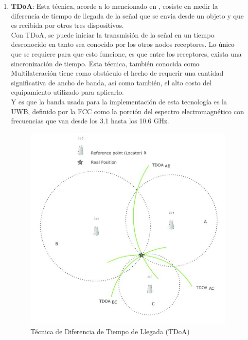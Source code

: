 \begin{itemize}
{\begin{enumerate}
        \item {\textbf{\ac{TDoA}}: Esta técnica, acorde a lo mencionado en \cite{17}, cosiste en medir la diferencia de tiempo de llegada de la señal que se envia desde un objeto y que es recibida por otros tres dispositivos.\\
        
        Con TDoA, se puede iniciar la transmisión de la señal en un tiempo desconocido en tanto sea conocido por los otros nodos receptores. Lo único que se requiere para que esto funcione, es que entre los receptores, exista una sincronización de tiempo. Esta técnica, también conocida como Multilateración tiene como obstáculo el hecho de requerir una cantidad significativa de ancho de banda, así como también, el alto costo del equipamiento utilizado para aplicarlo.\\
        
        Y es que la banda usada para la implementación de esta tecnología es la \ac{UWB}, definido por la \ac{FCC} como la porción del espectro electromagnético con frecuencias que van desde los 3.1 hasta los 10.6 GHz.\\
        
            \begin{figure}[h!]
                \centering
                \includegraphics[scale=1]{./images/tdoa}
                \caption{Técnica de Diferencia de Tiempo de Llegada (TDoA)}
                \label{fig:TDoA}
            \end{figure}
        
}
\end{enumerate}}
\end{itemize}
